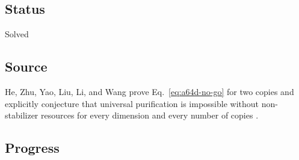 \subsection*{Status}

Solved

\subsection*{Source}

He, Zhu, Yao, Liu, Li, and Wang prove Eq.~\eqref{eq:a64d-no-go} for two
copies and explicitly conjecture that universal purification is impossible
without non-stabilizer resources for every dimension and every number of
copies .

\subsection*{Progress}

